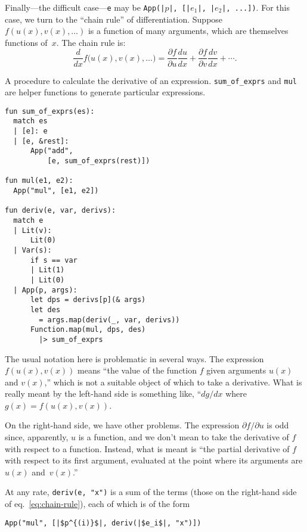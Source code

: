 \documentclass[11pt, a4paper]{article}
\newcommand{\cd}[1]{\texttt{#1}}
\begin{document}
Finally---the difficult case---\cd{e} may be \cd{App(|$p$|, [|$e_1$|,
  |$e_2$|, ...])}. For this case, we turn to the ``chain rule'' of
differentiation. Suppose $f(u(x), v(x), \dots)$ is a function of many
arguments, which are themselves functions of~$x$. The chain rule is:
\begin{equation}\label{eq:chain-rule}
  \frac{d}{dx}f\bigl(u(x), v(x), \dotsc\bigr) =
  \frac{\partial f}{\partial u} \frac{du}{dx} 
  + \frac{\partial f}{\partial v}\frac{dv}{dx}
  + \dotsb. 
\end{equation}

\begin{marginfigure}
  \caption{A procedure to calculate the derivative of an
    expression. \cd{sum_of_exprs} and \cd{mul} are helper functions to
    generate particular expressions.\label{fig:deriv}}
  \footnotesize%
\begin{verbatim}
fun sum_of_exprs(es):
  match es
  | [e]: e
  | [e, &rest]:
      App("add",
          [e, sum_of_exprs(rest)])

fun mul(e1, e2):
  App("mul", [e1, e2])

fun deriv(e, var, derivs):
  match e
  | Lit(v):
      Lit(0)
  | Var(s):
      if s == var
      | Lit(1)
      | Lit(0)
  | App(p, args):
      let dps = derivs[p](& args)
      let des
        = args.map(deriv(_, var, derivs))
      Function.map(mul, dps, des)
        |> sum_of_exprs 
\end{verbatim}
\end{marginfigure}
The usual notation here is problematic in several ways. The expression
$f(u(x), v(x))$ means ``the value of the function $f$ given arguments
$u(x)$ and $v(x)$,'' which is not a suitable object of which to take a
derivative. What is really meant by the left-hand side is something
like, ``$dg/dx$ where $g(x) = f(u(x),v(x))$.

On the right-hand side, we have other problems. The expression
$\partial f/\partial u$ is odd since, apparently, $u$ is a function, and we don't
mean to take the derivative of $f$ with respect to a
function. Instead, what is meant is ``the partial derivative of $f$
with respect to its first argument, evaluated at the point where its
arguments are $u(x)$ and~$v(x)$.''

At any rate, \cd{deriv(e, "x")} is a sum of the terms (those on the
right-hand side of eq.~\eqref{eq:chain-rule}), each of which is of the
form
\begin{verbatim}
App("mul", [|$p^{(i)}$|, deriv(|$e_i$|, "x")])
\end{verbatim}
\end{document}
